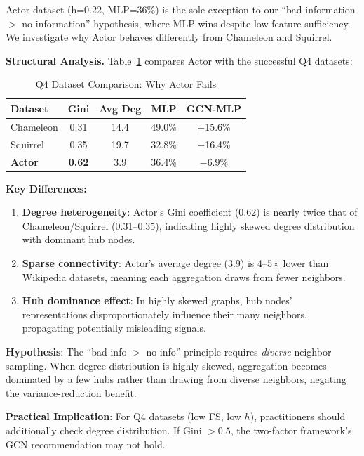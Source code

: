 Actor dataset (h=0.22, MLP=36\%) is the sole exception to our ``bad information $>$ no information'' hypothesis, where MLP wins despite low feature sufficiency. We investigate why Actor behaves differently from Chameleon and Squirrel.

\textbf{Structural Analysis.} Table~\ref{tab:actor_analysis} compares Actor with the successful Q4 datasets:

\begin{table}[t]
\centering
\caption{Q4 Dataset Comparison: Why Actor Fails}
\label{tab:actor_analysis}
\small
\begin{tabular}{@{}lcccc@{}}
\toprule
\textbf{Dataset} & \textbf{Gini} & \textbf{Avg Deg} & \textbf{MLP} & \textbf{GCN-MLP} \\
\midrule
Chameleon & 0.31 & 14.4 & 49.0\% & +15.6\% \\
Squirrel & 0.35 & 19.7 & 32.8\% & +16.4\% \\
\textbf{Actor} & \textbf{0.62} & 3.9 & 36.4\% & $-6.9\%$ \\
\bottomrule
\end{tabular}
\end{table}

\textbf{Key Differences:}
\begin{enumerate}
    \item \textbf{Degree heterogeneity}: Actor's Gini coefficient (0.62) is nearly twice that of Chameleon/Squirrel (0.31--0.35), indicating highly skewed degree distribution with dominant hub nodes.
    \item \textbf{Sparse connectivity}: Actor's average degree (3.9) is 4--5$\times$ lower than Wikipedia datasets, meaning each aggregation draws from fewer neighbors.
    \item \textbf{Hub dominance effect}: In highly skewed graphs, hub nodes' representations disproportionately influence their many neighbors, propagating potentially misleading signals.
\end{enumerate}

\textbf{Hypothesis}: The ``bad info $>$ no info'' principle requires \textit{diverse} neighbor sampling. When degree distribution is highly skewed, aggregation becomes dominated by a few hubs rather than drawing from diverse neighbors, negating the variance-reduction benefit.

\textbf{Practical Implication}: For Q4 datasets (low FS, low $h$), practitioners should additionally check degree distribution. If Gini $> 0.5$, the two-factor framework's GCN recommendation may not hold.

